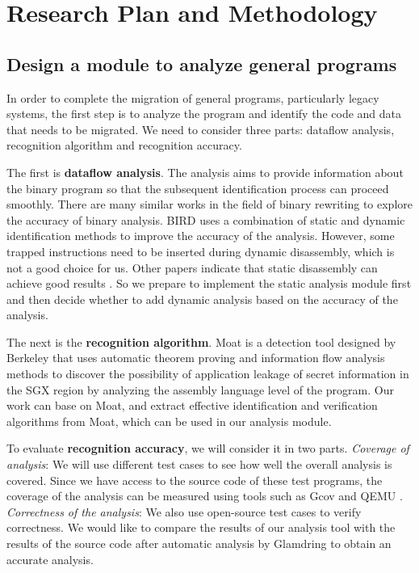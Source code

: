 \section{Research Plan and Methodology}
\subsection{Design a module to analyze general programs}
\label{sec:ToolToAnalyze}
In order to complete the migration of general programs, particularly legacy systems,
the first step is to analyze the program and identify the code and data that needs to
be migrated. We need to consider three parts: dataflow analysis, recognition algorithm
and recognition accuracy.

The first is \textbf{dataflow analysis}. The analysis aims to provide
information about the binary program so that the subsequent identification process
can proceed smoothly.
There are many similar works in the field of binary rewriting to explore
the accuracy of binary analysis.
BIRD \cite{Nanda2006BIRDBI} uses a combination of static and dynamic identification
methods to improve the accuracy of the analysis. However, some trapped instructions
need to be inserted during dynamic disassembly, which is not a good choice for us.
Other papers indicate that static disassembly can achieve good results
\cite{Andriesse2016AnIA}. So we prepare to implement the static analysis module first
and then decide whether to add dynamic analysis based on the accuracy of the analysis.

The next is the \textbf{recognition algorithm}.
Moat \cite{Sinha2015MoatVC} is a detection tool designed by Berkeley that uses
automatic theorem proving and information flow analysis methods to discover the
possibility of application leakage of secret information in the SGX region by
analyzing the assembly language level of the program.
Our work can base on Moat, and extract effective identification and verification
algorithms from Moat, which can be used in our analysis module.

To evaluate \textbf{recognition accuracy}, we will consider it in two parts.
\textit{Coverage of analysis}:
We will use different test cases to see how well the overall analysis is covered.
Since we have access to the source code of these test programs,
the coverage of the analysis can be measured using tools such as Gcov \cite{GCOV}
and QEMU \cite{Bellard2005QEMUAF}.
\textit{Correctness of the analysis}:
We also use open-source test cases to verify correctness.
We would like to compare the results of our analysis tool with the results of the
source code after automatic analysis by Glamdring \cite{Lind2017GlamdringAA} to obtain
an accurate analysis.

